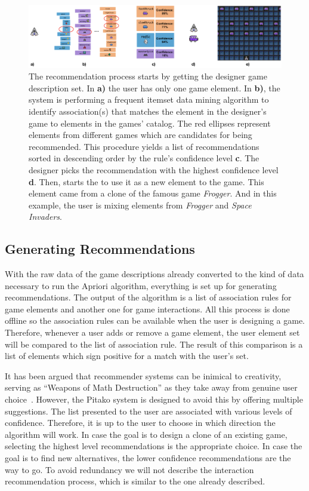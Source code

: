 \documentclass[letterpaper]{article} %
\begin{document}
\begin{figure}[ht]
\includegraphics[width=\linewidth]{process.png}
\caption{The recommendation process starts by getting the designer game description set. In \textbf{a)} the user has only one game element. In \textbf{b)}, the system is performing a frequent itemset data mining algorithm to identify association(s) that matches the element in the designer's game to elements in the games' catalog. The red ellipses represent elements from different games which are candidates for being recommended. This procedure yields a list of recommendations sorted in descending order by the rule's confidence level \textbf{c}. The designer picks the recommendation with the highest confidence level \textbf{d}. Then, starts the to use it as a new element to the game. This element came from a clone of the famous game \textit{Frogger}. And in this example, the user is mixing elements from \textit{Frogger} and \textit{Space Invaders}.}
\label{process}
\end{figure}

\subsection{Generating Recommendations}
With the raw data of the game descriptions already converted to the kind of data necessary to run the Apriori algorithm, everything is set up for generating recommendations. The output of the algorithm is a list of association rules for game elements and another one for game interactions. All this process is done offline so the association rules can be available when the user is designing a game. Therefore, whenever a user adds or remove a game element, the user element set will be compared to the list of association rule. The result of this comparison is a list of elements which sign positive for a match with the user's set.

It has been argued that recommender systems can be inimical to creativity, serving as ``Weapons of Math Destruction'' as they take away from genuine user choice~\cite{o2017weapons}. However, the Pitako system is designed to avoid this by offering multiple suggestions.  The list presented to the user are associated with various levels of confidence. Therefore, it is up to the user to choose in which direction the algorithm will work. In case the goal is to design a clone of an existing game, selecting the highest level recommendations is the appropriate choice. In case the goal is to find new alternatives, the lower confidence recommendations are the way to go. To avoid redundancy we will not describe the interaction recommendation process, which is similar to the one already described.
\end{document}

